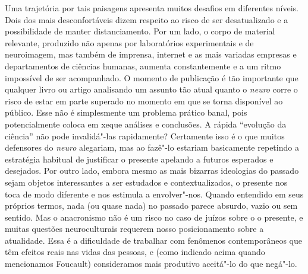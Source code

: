Uma trajetória por tais paisagens apresenta muitos desafios em
diferentes níveis. Dois dos mais desconfortáveis dizem respeito ao risco
de ser desatualizado e a possibilidade de manter distanciamento. Por um
lado, o corpo de material relevante, produzido não apenas por laboratórios
experimentais e de neuroimagem, mas também de imprensa,
internet e as mais variadas empresas e departamentos de ciências
humanas, aumenta constantemente e a um ritmo impossível de ser
acompanhado. O momento de publicação é tão importante que qualquer livro
ou artigo analisando um assunto tão atual quanto o \emph{neuro} corre o
risco de estar em parte superado no momento em que se torna disponível
ao público. Esse não é simplesmente um problema prático banal, pois
potencialmente coloca em xeque análises e conclusões. A rápida
``evolução da ciência'' não pode invalidá"-las rapidamente? Certamente
isso é o que muitos defensores do \emph{neuro} alegariam, mas ao fazê"-lo
estariam basicamente repetindo a estratégia habitual de justificar o
presente apelando a futuros esperados e desejados. Por outro lado,
embora mesmo as mais bizarras ideologias do passado sejam objetos
interessantes a ser estudados e contextualizados, o presente nos toca de
modo diferente e nos estimula a envolver"-nos. Quando entendido em seus
próprios termos, nada (ou quase nada) no passado parece absurdo, vazio
ou sem sentido. Mas o anacronismo não é um risco no caso de juízos sobre
o o presente, e muitas questões neuroculturais requerem nosso
posicionamento sobre a atualidade. Essa é a dificuldade de trabalhar com
fenômenos contemporâneos que têm efeitos reais nas vidas das pessoas, e
(como indicado acima quando mencionamos Foucault) consideramos mais
produtivo aceitá"-lo do que negá"-lo.

